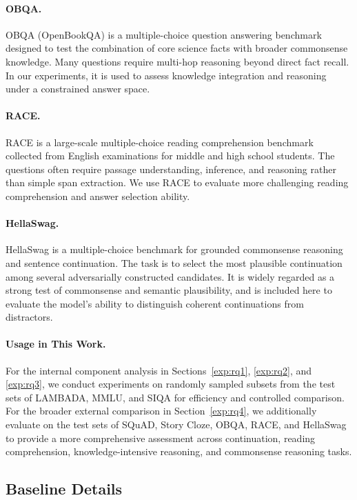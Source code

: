 \paragraph{OBQA.}
OBQA \citep{mihaylov2018can} (OpenBookQA) is a multiple-choice question answering benchmark designed to test the combination of core science facts with broader commonsense knowledge. Many questions require multi-hop reasoning beyond direct fact recall. In our experiments, it is used to assess knowledge integration and reasoning under a constrained answer space.

\paragraph{RACE.}
RACE \citep{lai2017race} is a large-scale multiple-choice reading comprehension benchmark collected from English examinations for middle and high school students. The questions often require passage understanding, inference, and reasoning rather than simple span extraction. We use RACE to evaluate more challenging reading comprehension and answer selection ability.

\paragraph{HellaSwag.}
HellaSwag \citep{zellers2019hellaswag} is a multiple-choice benchmark for grounded commonsense reasoning and sentence continuation. The task is to select the most plausible continuation among several adversarially constructed candidates. It is widely regarded as a strong test of commonsense and semantic plausibility, and is included here to evaluate the model's ability to distinguish coherent continuations from distractors.

\paragraph{Usage in This Work.}
For the internal component analysis in Sections~\ref{exp:rq1}, \ref{exp:rq2}, and \ref{exp:rq3}, we conduct experiments on randomly sampled subsets from the test sets of LAMBADA, MMLU, and SIQA for efficiency and controlled comparison. For the broader external comparison in Section~\ref{exp:rq4}, we additionally evaluate on the test sets of SQuAD, Story Cloze, OBQA, RACE, and HellaSwag to provide a more comprehensive assessment across continuation, reading comprehension, knowledge-intensive reasoning, and commonsense reasoning tasks.

\subsection{Baseline Details}
\label{app:baseline}


